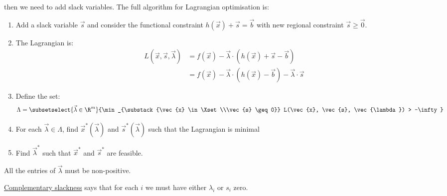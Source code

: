 \documentclass[../Main.tex]{subfiles}
\begin{document}
then we need to add slack variables. The full algorithm for Lagrangian optimisation is:
\begin{enumerate}
    \item Add a slack variable $\vec{s}$ and consider the functional constraint $h(\vec{x}) + \vec{s} = \vec{b}$ with new regional constraint $\vec{s} \geq \vec0$.
    \item The Lagrangian is:
        \begin{align*}
            L(\vec{x}, \vec{s}, \vec{\lambda}) &= f(\vec{x}) - \vec{\lambda} \cdot (h(\vec{x}) + \vec{s} - \vec{b}) \\
            &= f(\vec{x}) - \vec{\lambda} \cdot (h(\vec{x}) - \vec{b}) - \vec{\lambda} \cdot \vec{s}
        \end{align*}
    \item Define the set:
        \begin{equation*}
            \Lambda = \subsetselect{\vec{\lambda} \in \R^m}{\min_{\substack{\vec{x} \in \Xset\\\vec{s} \geq 0}} L(\vec{x}, \vec{s}, \vec{\lambda}) > -\infty}
        \end{equation*}
    \item For each $\vec{\lambda} \in \Lambda$, find $\vec{x}^*(\vec{\lambda})$ and $\vec{s}^*(\vec{\lambda})$ such that the Lagrangian is minimal
    \item Find $\vec{\lambda}^*$ such that $\vec{x}^*$ and $\vec{s}^*$ are feasible.
\end{enumerate}
\begin{remarks}
    \item All the entries of $\vec{\lambda}$ must be non-positive.
    \item \underline{Complementary slackness} says that for each $i$ we must have either $\lambda_i$ or $s_i$ zero.
\end{remarks}
\end{document}
